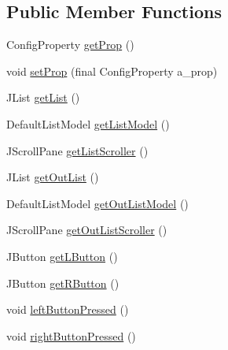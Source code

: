 \subsection*{Public Member Functions}
\begin{DoxyCompactItemize}
\item 
Config\-Property \hyperlink{classorg_1_1jgap_1_1gui_1_1_config_frame_1_1_list_group_a898b452fde443862afb4417b47ebf2cf}{get\-Prop} ()
\item 
void \hyperlink{classorg_1_1jgap_1_1gui_1_1_config_frame_1_1_list_group_aacf238730ee9416abe267c471372f03e}{set\-Prop} (final Config\-Property a\-\_\-prop)
\item 
J\-List \hyperlink{classorg_1_1jgap_1_1gui_1_1_config_frame_1_1_list_group_a3a8c3102d3b70559c9c703002a8b8a9e}{get\-List} ()
\item 
Default\-List\-Model \hyperlink{classorg_1_1jgap_1_1gui_1_1_config_frame_1_1_list_group_aa1dcbcb108763f47c056f116d041a22e}{get\-List\-Model} ()
\item 
J\-Scroll\-Pane \hyperlink{classorg_1_1jgap_1_1gui_1_1_config_frame_1_1_list_group_a7eb4a56d2d41877c8acd8996a45b3805}{get\-List\-Scroller} ()
\item 
J\-List \hyperlink{classorg_1_1jgap_1_1gui_1_1_config_frame_1_1_list_group_a54e1c7a20dae47d5ea6d7f828da91ed5}{get\-Out\-List} ()
\item 
Default\-List\-Model \hyperlink{classorg_1_1jgap_1_1gui_1_1_config_frame_1_1_list_group_a2d4594fce401574334dbd1e27b441df4}{get\-Out\-List\-Model} ()
\item 
J\-Scroll\-Pane \hyperlink{classorg_1_1jgap_1_1gui_1_1_config_frame_1_1_list_group_a9cad1b5c35ad787d77b224836302db5d}{get\-Out\-List\-Scroller} ()
\item 
J\-Button \hyperlink{classorg_1_1jgap_1_1gui_1_1_config_frame_1_1_list_group_af4fcb1784c02f387e25dbf40f073b9c8}{get\-L\-Button} ()
\item 
J\-Button \hyperlink{classorg_1_1jgap_1_1gui_1_1_config_frame_1_1_list_group_a69699f68ae749c29d5e0b769ee7e2b9d}{get\-R\-Button} ()
\item 
void \hyperlink{classorg_1_1jgap_1_1gui_1_1_config_frame_1_1_list_group_a2a1fe2bf41a012be05362e9e18fd0fbf}{left\-Button\-Pressed} ()
\item 
void \hyperlink{classorg_1_1jgap_1_1gui_1_1_config_frame_1_1_list_group_af96b36d8df7e0d231b3717c49b32719a}{right\-Button\-Pressed} ()
\end{DoxyCompactItemize}
